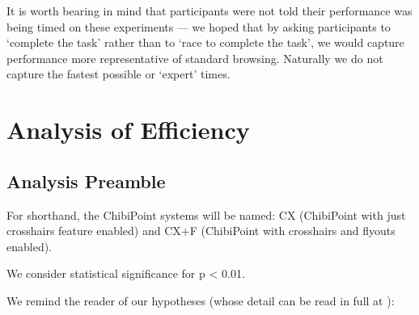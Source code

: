 \documentclass[a4paper, 12pt]{report}
\begin{document}
It is worth bearing in mind that participants were not told their performance was being timed on these experiments --- we hoped that by asking participants to `complete the task' rather than to `race to complete the task', we would capture performance more representative of standard browsing. Naturally we do not capture the fastest possible or `expert' times.

\section{Analysis of Efficiency}
\subsection{Analysis Preamble}
For shorthand, the ChibiPoint systems will be named: CX (ChibiPoint with just crosshairs feature enabled) and CX+F (ChibiPoint with crosshairs and flyouts enabled).

We consider statistical significance for p < 0.01.

We remind the reader of our hypotheses (whose detail can be read in full at ):

\textbf{\hypone}\\
\textbf{\hyptwo}\\
\clearpage
\end{document}
